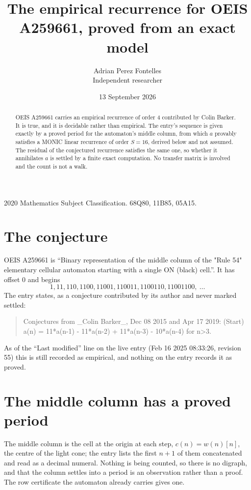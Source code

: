 \documentclass[11pt,a4paper]{article}
\title{The empirical recurrence for OEIS A259661, proved from an exact model}
\author{Adrian Perez Fontelles\\ \small Independent researcher}
\date{13 September 2026}
\theoremstyle{plain}
\theoremstyle{definition}
\begin{document}
\maketitle

\begin{abstract}
OEIS A259661 carries an empirical recurrence of order $4$ contributed by Colin Barker. It is true, and it is
decidable rather than empirical. The entry's sequence is given exactly by a proved period for the automaton's middle column, from
which $a$ provably satisfies a MONIC linear recurrence of order $S=16$, derived below and not
assumed. The residual of the conjectured recurrence satisfies the same one, so whether it
annihilates $a$ is settled by a finite exact computation. No transfer matrix is involved and
the count is not a walk.
\end{abstract}

\noindent\small 2020 Mathematics Subject Classification. 68Q80, 11B85, 05A15.\normalsize

\section{The conjecture}

OEIS A259661 is ``Binary representation of the middle column of the "Rule 54" elementary cellular automaton starting with a single ON (black) cell.''. It has offset $0$ and begins
\[
1, 11, 110, 1100, 11001, 110011, 1100110, 11001100,\ \dots
\]
The entry states, as a conjecture contributed by its author and never marked settled:
\begin{quote}
Conjectures from \_Colin Barker\_, Dec 08 2015 and Apr 17 2019: (Start) a(n) = 11*a(n-1) - 11*a(n-2) + 11*a(n-3) - 10*a(n-4) for n>3.
\end{quote}
As of the ``Last modified'' line on the live entry (Feb 16 2025 08:33:26, revision 55)
this is still recorded as empirical, and nothing on the entry records it as proved.

\section{The middle column has a proved period}

The middle column is the cell at the origin at each step, $c(n)=w(n)[n]$, the centre of the
light cone; the entry lists the first $n+1$ of them concatenated and read as a decimal numeral. Nothing is being counted, so there is no digraph, and that
the column settles into a period is an observation rather than a proof. The row certificate the
automaton already carries gives one.
\end{document}
